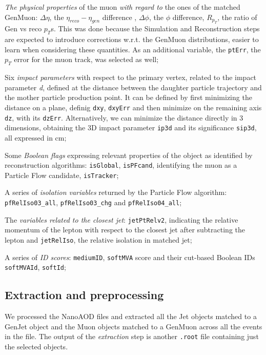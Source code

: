 \begin{outline}
\1 \emph{The physical properties} of the muon \emph{with regard to} the ones of the matched GenMuon: $\Delta\eta$, the $\eta_{reco} - \eta_{gen}$ difference , $\Delta\phi$, the $\phi$ difference, $R_{p_T}$, the ratio of Gen vs reco $p_T$s. This was done because the Simulation and Reconstruction steps are expected to introduce corrections w.r.t. the GenMuon distributions, easier to learn when considering these quantities. As an additional variable, the \texttt{ptErr}, the $p_T$ error for the muon track, was selected as well;

\1 Six \emph{impact parameters} with respect to the primary vertex, related to the impact parameter \emph{d}, defined at the distance between the daughter particle trajectory and the mother particle production point. It can be defined by first minimizing the distance on a plane, definig \texttt{dxy}, \texttt{dxyErr} and then minimize on the remaining axis \texttt{dz}, with its \texttt{dzErr}. Alternatively, we can minimize the distance directly in 3 dimensions, obtaining the 3D impact parameter \texttt{ip3d} and its significance \texttt{sip3d}, all expressed in cm;

\1 Some \emph{Boolean flags} expressing relevant properties of the object as identified by reconstruction algorithms: \texttt{isGlobal}, \texttt{isPFcand}, identifying the muon as a Particle Flow candidate, \texttt{isTracker};

\1 A series of \emph{isolation variables} returned by the Particle Flow algorithm: \texttt{pfRelIso03\_all}, \texttt{pfRelIso03\_chg} and \texttt{pfRelIso04\_all};

\1 The \emph{variables related to the closest jet}: \texttt{jetPtRelv2}, indicating the relative momentum of the lepton with respect to the closest jet after subtracting the lepton and \texttt{jetRelIso}, the relative isolation in matched jet;

\1 A series of \emph{ID scores}: \texttt{mediumID}, \texttt{softMVA} score and their cut-based Boolean IDs \texttt{softMVAId}, \texttt{softId};
\end{outline}

\subsection{Extraction and preprocessing}

We processed the NanoAOD files and extracted all the Jet objects matched to a GenJet object and the Muon objects matched to a GenMuon across all the events in the file.
The output of the \emph{extraction} step is another \texttt{.root} file containing just the selected objects.


